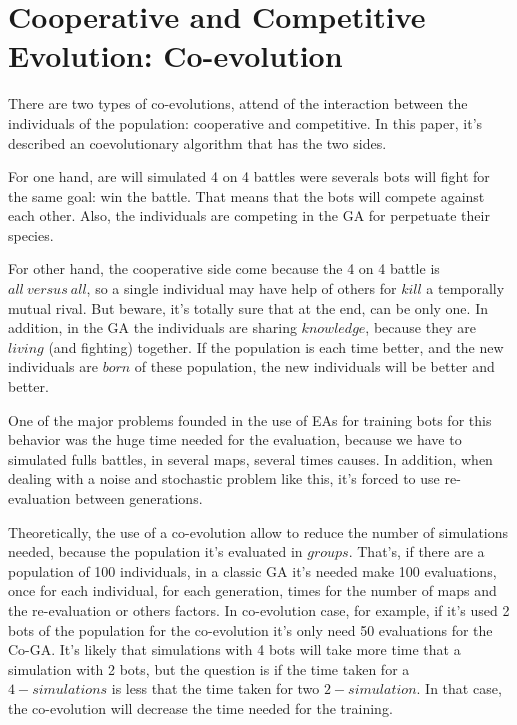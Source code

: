 \documentclass{llncs}
\begin{document}
%
\section{Cooperative and Competitive Evolution: Co-evolution}
\label{sec:co-genebot}


There are two types of co-evolutions, attend of the interaction between the individuals of the population: cooperative and competitive. In this paper, it's described an coevolutionary algorithm that has the two sides.

For one hand, are will simulated 4 on 4 battles were severals bots will fight for the same goal: win the battle. That means that the bots will compete against each other. Also, the individuals are competing in the GA for perpetuate their species.

For other hand, the cooperative side come because the 4 on 4 battle is {$all\ versus\ all$}, so a single individual may have help of others for {$kill$} a temporally mutual rival. But beware, it's totally sure that at the end, can be only one. In addition, in the GA the individuals are sharing {$knowledge$}, because they are {$living$} (and fighting) together. If the population is each time better, and the new individuals are {$born$} of these population, the new individuals will be better and better.

One of the major problems founded in the use of EAs for training bots for this behavior was the huge time needed for the evaluation, because we have to simulated fulls battles, in several maps, several times causes. In addition, when dealing with a noise and stochastic problem like this, it's forced to use re-evaluation between generations.

Theoretically, the use of a co-evolution allow to reduce the number of simulations needed, because the population it's evaluated in {$groups$}. That's, if there are a population of 100 individuals, in a classic GA it's needed make 100 evaluations, once for each individual, for each generation, times for the number of maps and the re-evaluation or others factors. In co-evolution case, for example, if it's used 2 bots of the population for the co-evolution it's only need 50 evaluations for the Co-GA. It's likely that simulations with 4 bots will take more time that a simulation with 2 bots, but the question is if the time taken for a {$4-simulations$} is less that the time taken for two {$2-simulation$}. In that case, the co-evolution will decrease the time needed for the training.
\end{document}
